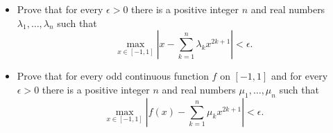 \begin{itemize}
\item[(a)] Prove that for every \(\epsilon>0\) there is a positive integer \(n\) and real
numbers \(\lambda_{1},\dots,\lambda_{n}\) such that
\[\max_{x\in [-1,1]}|x-\sum_{k=1}^{n}\lambda_{k}x^{2k+1}|<\epsilon.\]
\item[(b)] Prove that for every odd continuous function \(f\) on \([-1,1]\) and for every \(\epsilon>0\) there is a positive integer \(n\) and real numbers \(\mu_{1},\dots,\mu_{n}\) such that
\[\max_{x\in [-1,1]}|f(x)-\sum_{k=1}^{n}\mu_{k}x^{2k+1}|<\epsilon.\]
\end{itemize}
